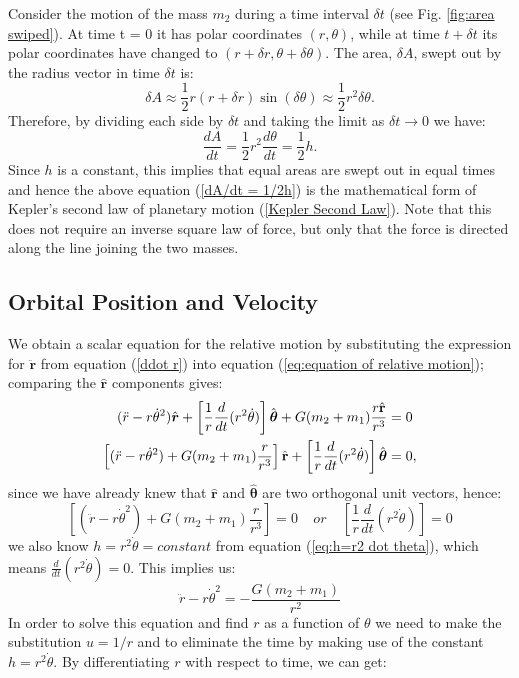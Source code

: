 Consider the motion of the mass $m_2$ during a time interval $\delta t$ (see Fig. \ref{fig:area swiped}). At time t = 0 it has polar coordinates $(r, \theta)$, while at time $t + \delta t$ its polar coordinates have changed to $(r + \delta r, \theta + \delta \theta)$. The area, $\delta A$, swept out by the radius vector in time $\delta t$ is:
\begin{equation}
    \delta A \approx \frac{1}{2}r(r+\delta r)\sin(\delta \theta) \approx \frac{1}{2} r^2 \delta \theta.
\end{equation}
Therefore, by dividing each side by $\delta t$ and taking the limit as $\delta t \rightarrow 0$ we have:
\begin{equation}
    \frac{dA}{dt} = \frac{1}{2}r^2\frac{d\theta}{dt} = \frac{1}{2}h.
    \label{dA/dt = 1/2h}
\end{equation}
Since $h$ is a constant, this implies that equal areas are swept out in equal times and hence the above equation (\ref{dA/dt = 1/2h}) is the mathematical form of Kepler’s second law of planetary motion (\ref{Kepler Second Law}). Note that this does not require an inverse square law of force, but only that the force is directed along the line joining the two masses.

\subsection{Orbital Position and Velocity}
We obtain a scalar equation for the relative motion by substituting the expression for $\mathbf{\ddot{r}}$ from equation (\ref{ddot r}) into equation (\ref{eq:equation of relative motion}); comparing the $\hat{\mathbf{r}}$ components gives:
\begin{align}
    (\ddot{r} - r\dot{\theta}^2)\hat{\boldsymbol{r}} + \left[ \frac{1}{r}\frac{d}{dt}(r^2\dot{\theta}) \right] \hat{\boldsymbol{\theta}} + G(m_{2}+m_{1})\frac{r\hat{\mathbf{r}}}{r^3} & = 0 \notag\\
    \left[ (\ddot{r} - r\dot{\theta}^2) + G(m_{2}+m_{1})\frac{r}{r^3} \right] \hat{\mathbf{r}} + \left[ \frac{1}{r}\frac{d}{dt}(r^2\dot{\theta}) \right] \hat{\boldsymbol{\theta}} & = 0,
\end{align}
since we have already knew that $\hat{\boldsymbol{r}}$ and $\hat{\boldsymbol{\theta}}$ are two orthogonal unit vectors, hence:
\begin{equation}
    \left[ (\ddot{r} - r\dot{\theta}^2) + G(m_{2}+m_{1})\frac{r}{r^3} \right] = 0 ~~~~~or~~~~~ \left[ \frac{1}{r}\frac{d}{dt}(r^2\dot{\theta}) \right] = 0
\end{equation}
we also know $h = r^2\dot{\theta} = constant$ from equation (\ref{eq:h=r2 dot theta}), which means $\frac{d}{dt}(r^2\dot{\theta}) = 0$. This implies us:
\begin{equation}
    \ddot{r} - r\dot{\theta}^2 = -\frac{G(m_{2}+m_{1})}{r^2}
    \label{relative motion equation 2}
\end{equation}
In order to solve this equation and find $r$ as a function of $\theta$ we need to make the substitution $u = 1/r$ and to eliminate the time by making use of the constant $h = r^2 \dot{\theta}$. By differentiating $r$ with respect to time, we can get:

